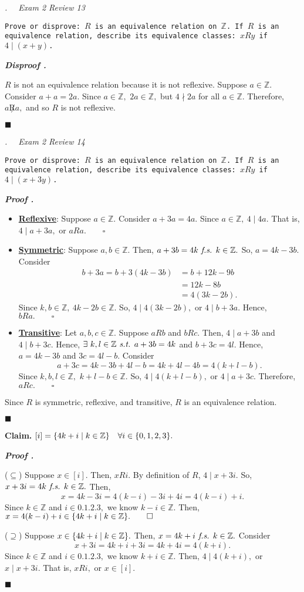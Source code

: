 \documentclass[11pt,letter]{article}
\newcounter{nq}[section]
\newcounter{np}[section]
\newenvironment*{p}{\par\noindent\textbf{\textit{Proof \stepcounter{np}\thenp. }}\par}{\par\hfill $\blacksquare$\par}
\newenvironment*{dis}{\par\noindent\textbf{\textit{Disproof \stepcounter{np}\thenp. }}\par}{\par\hfill $\blacksquare$\par}
\newenvironment*{q}[1]{\noindent\emph{\thesection.\stepcounter{nq}\thenq$\quad $ #1}\par\noindent\texttt}{}
\newenvironment*{clm}{\par\noindent\textbf{Claim. }}{\par}
\def\Z{{\mathbb{Z}}}
\def\st{\emph{ s.t. }}
\def\fs{\emph{ f.s. }}
\begin{document}
\begin{framed}\begin{q}
	{Exam 2 Review 13}
	{Prove or disprove: $R$ is an equivalence relation on $\Z$. If $R$ is an equivalence relation, describe its equivalence classes: $xRy$ if $4\mid(x+y)$. }
\end{q}\end{framed}
\begin{dis}
	$R$ is not an equivalence relation because it is not reflexive. Suppose $a\in\Z.$ Consider $a+a=2a.$ Since $a\in\Z,$ $2a\in\Z,$ but $4\nmid 2a$ for all $a\in\Z.$ Therefore, $a\not Ra,$ and so $R$ is not reflexive.	
\end{dis}

\begin{framed}\begin{q}
	{Exam 2 Review 14}
	{Prove or disprove: $R$ is an equivalence relation on $\Z$. If $R$ is an equivalence relation, describe its equivalence classes: $xRy$ if $4\mid(x+3y)$. }
\end{q}\end{framed}
\begin{p}
	\begin{itemize}
		\item \underline{\textbf{Reflexive}}: Suppose $a\in\Z.$ Consider $a+3a=4a.$ Since $a\in\Z,\ 4\mid4a.$ That is, $4\mid a+3a,$ or $aRa.\qquad\square$
		\item \underline{\textbf{Symmetric}}: Suppose $a,b\in\Z.$ Then, $a+3b=4k\fs k\in\Z.$ So, $a=4k-3b.$ Consider \[\begin{aligned}b+3a=b+3(4k-3b)&=b+12k-9b\\&=12k-8b\\&=4(3k-2b).\end{aligned}\] Since $k,b\in\Z,\ 4k-2b\in\Z.$ So, $4\mid4(3k-2b),$ or $4\mid b+3a.$ Hence, $bRa. \qquad\square$
		\item \underline{\textbf{Transitive}}: Let $a,b,c\in\Z.$ Suppose $aRb$ and $bRc.$ Then, $4\mid a+3b$ and $4\mid b+3c.$ Hence, $\exists\ k,l\in\Z\st a+3b=4k$ and $b+3c=4l.$ Hence, $a=4k-3b$ and $3c=4l-b.$ Consider \[a+3c=4k-3b+4l-b=4k+4l-4b=4(k+l-b).\] Since $k,b,l\in\Z,$ $k+l-b\in\Z.$ So, $4\mid4(k+l-b),$ or $4\mid a+3c.$ Therefore, $aRc.\qquad\square$
	\end{itemize}
	Since $R$ is symmetric, reflexive, and transitive, $R$ is an equivalence relation.
\end{p}
\begin{clm}
	$[i]=\qty{4k+i\mid k\in\Z}\quad\forall i\in\qty{0,1,2,3}.$
\end{clm}
\begin{p}
	($\subseteq$) Suppose $x\in[i].$ Then, $xRi.$ By definition of $R$, $4\mid x+3i.$ So, $x+3i=4k\fs k\in\Z.$ Then, \[x=4k-3i=4(k-i)-3i+4i=4(k-i)+i.\] Since $k\in\Z$ and $i\in\qty{0,1,2,3},$ we know $k-i\in\Z.$ Then, $x=4(k-i)+i\in\qty{4k+i\mid k\in\Z}.\qquad\square$\par 
	($\supseteq$) Suppose $x\in\qty{4k+i\mid k\in\Z}.$ Then, $x=4k+i\fs k\in\Z.$ Consider \[x+3i=4k+i+3i=4k+4i=4(k+i).\] Since $k\in\Z$ and $i\in\qty{0,1,2,3},$ we know $k+i\in\Z.$ Then, $4\mid4(k+i),$ or $x\mid x+3i.$ That is, $xRi,$ or $x\in[i].$
\end{p}
\end{document}
